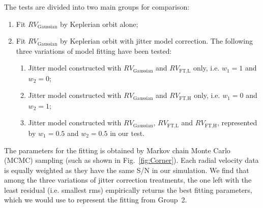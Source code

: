 The tests are divided into two main groups for comparison:
\begin{enumerate}
	\item Fit $RV_\text{Gaussian}$ by Keplerian orbit alone;
	\item Fit $RV_\text{Gaussian}$ by Keplerian orbit with jitter model correction. The following three variations of model fitting have been tested:
   \begin{enumerate}
     \item Jitter model constructed with $RV_\text{Gaussian}$ and $RV_\text{FT,L}$ only, i.e. $w_1=1$ and $w_2=0$;
     \item Jitter model constructed with $RV_\text{Gaussian}$ and $RV_\text{FT,H}$ only, i.e. $w_1=0$ and $w_2=1$;
     \item Jitter model constructed with $RV_\text{Gaussian}$, $RV_\text{FT,L}$ and $RV_\text{FT,H}$, represented by $w_1=0.5$ and $w_2=0.5$ in our test. 
   \end{enumerate}
\end{enumerate}
The parameters for the fitting is obtained by Markov chain Monte Carlo (MCMC) sampling (such as shown in Fig.~\ref{fig:Corner}). Each radial velocity data is equally weighted as they have the same S/N in our simulation. We find that among the three variations of jitter correction treatments, the one left with the least residual (i.e. smallest rms) empirically returns the best fitting parameters, which we would use to represent the fitting from Group~2. 

